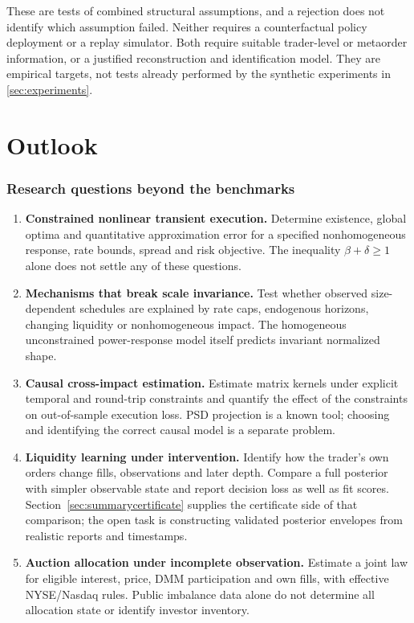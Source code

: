 \documentclass[11pt]{article}
\numberwithin{equation}{section}
\theoremstyle{definition}
\theoremstyle{remark}
\theoremstyle{definition}
\begin{document}
These are tests of combined structural assumptions, and a rejection does not
identify which assumption failed. Neither requires a counterfactual policy
deployment or a replay simulator. Both require suitable trader-level or
metaorder information, or a justified reconstruction and identification model.
They are empirical targets, not tests already performed by the synthetic
experiments in \cref{sec:experiments}.

\clearpage
\part{Outlook}\label{pt:outlook}
\section{Research questions beyond the benchmarks}\label{sec:open}

\begin{enumerate}
\item \textbf{Constrained nonlinear transient execution.} Determine existence,
global optima and quantitative approximation error for a specified nonhomogeneous
response, rate bounds, spread and risk objective. The inequality
$\beta+\delta\geq1$ alone does not settle any of these questions.
\item \textbf{Mechanisms that break scale invariance.}\label{item:scaleinvariance} Test whether observed
size-dependent schedules are explained by rate caps, endogenous horizons,
changing liquidity or nonhomogeneous impact. The homogeneous unconstrained
power-response model itself predicts invariant normalized shape.
\item \textbf{Causal cross-impact estimation.} Estimate matrix kernels under
explicit temporal and round-trip constraints and quantify the effect of the
constraints on out-of-sample execution loss. PSD projection is a known tool;
choosing and identifying the correct causal model is a separate problem.
\item \textbf{Liquidity learning under intervention.} Identify how the trader's
own orders change fills, observations and later depth. Compare a full posterior
with simpler observable state and report decision loss as well as fit scores.
Section~\ref{sec:summarycertificate} supplies the certificate side of that
comparison; the open task is constructing validated posterior envelopes
from realistic reports and timestamps.
\item \textbf{Auction allocation under incomplete observation.} Estimate a joint
law for eligible interest, price, DMM participation and own fills, with effective
NYSE/Nasdaq rules. Public imbalance data alone do not determine all allocation
state or identify investor inventory.
\end{enumerate}
\end{document}
